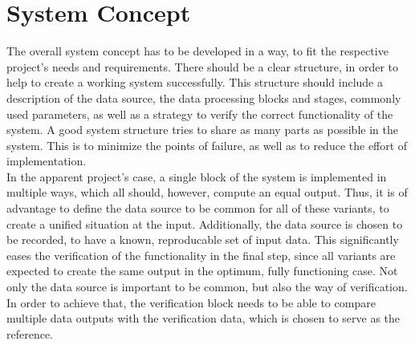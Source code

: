 
\section{System Concept}

The overall system concept has to be developed in a way, to fit the respective project's needs and requirements.
There should be a clear structure, in order to help to create a working system successfully.
This structure should include a description of the data source, the data processing blocks and stages, commonly used parameters, as well as a strategy to verify the correct functionality of the system.
A good system structure tries to share as many parts as possible in the system.
This is to minimize the points of failure, as well as to reduce the effort of implementation.\\

In the apparent project's case, a single block of the system is implemented in multiple ways, which all should, however, compute an equal output.
Thus, it is of advantage to define the data source to be common for all of these variants, to create a unified situation at the input.
Additionally, the data source is chosen to be recorded, to have a known, reproducable set of input data.
This significantly eases the verification of the functionality in the final step, since all variants are expected to create the same output in the optimum, fully functioning case.
Not only the data source is important to be common, but also the way of verification.
In order to achieve that, the verification block needs to be able to compare multiple data outputs with the verification data, which is chosen to serve as the reference.\\

